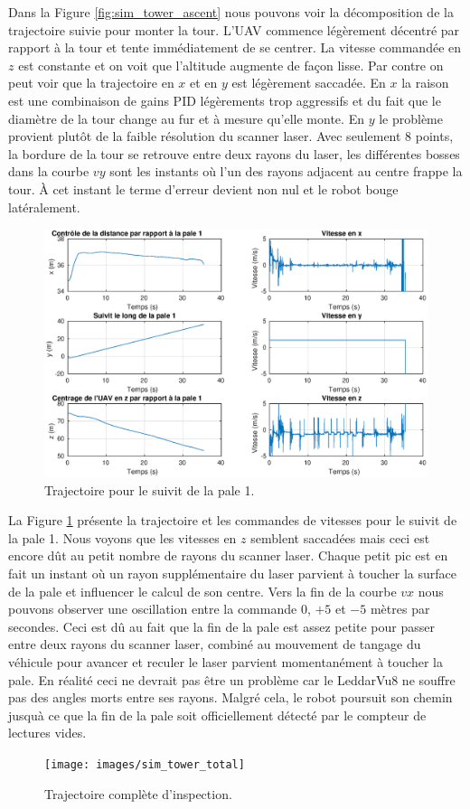 Dans la Figure \ref{fig:sim_tower_ascent} nous pouvons voir la décomposition de la trajectoire suivie pour monter la tour. L'UAV commence légèrement décentré par rapport à la tour et tente immédiatement de se centrer. La vitesse commandée en $z$ est constante et on voit que l'altitude augmente de façon lisse. Par contre on peut voir que la trajectoire en $x$ et en $y$ est légèrement saccadée. En $x$ la raison est une combinaison de gains PID légèrements trop aggressifs et du fait que le diamètre de la tour change au fur et à mesure qu'elle monte. En $y$ le problème provient plutôt de la faible résolution du scanner laser. Avec seulement 8 points, la bordure de la tour se retrouve entre deux rayons du laser, les différentes bosses dans la courbe $vy$ sont les instants où l'un des rayons adjacent au centre frappe la tour. À cet instant le terme d'erreur devient non nul et le robot bouge latéralement.
\begin{figure}[htp]
  \centering
  \includegraphics[trim=30 20 30 0, clip, width=\linewidth]{images/sim_suivit_pale}
  \caption{Trajectoire pour le suivit de la pale 1.}
  \label{fig:sim_suivit_pale}
\end{figure}

La Figure \ref{fig:sim_suivit_pale} présente la trajectoire et les commandes de vitesses pour le suivit de la pale 1. Nous voyons que les vitesses en $z$ semblent saccadées mais ceci est encore dût au petit nombre de rayons du scanner laser. Chaque petit pic est en fait un instant où un rayon supplémentaire du laser parvient à toucher la surface de la pale et influencer le calcul de son centre. Vers la fin de la courbe $vx$ nous pouvons observer une oscillation entre la commande $0$, $+5$ et $-5$ mètres par secondes. Ceci est dû au fait que la fin de la pale est assez petite pour passer entre deux rayons du scanner laser, combiné au mouvement de tangage du véhicule pour avancer et reculer le laser parvient momentanément à toucher la pale. En réalité ceci ne devrait pas être un problème car le LeddarVu8 ne souffre pas des angles morts entre ses rayons. Malgré cela, le robot poursuit son chemin jusquà ce que la fin de la pale soit officiellement détecté par le compteur de lectures vides.
\begin{figure}[htb]
  \centering
  \texttt{[image: images/sim\_tower\_total]}
  \caption{Trajectoire complète d'inspection.}
  \label{fig:sim_tower_total}
\end{figure}

